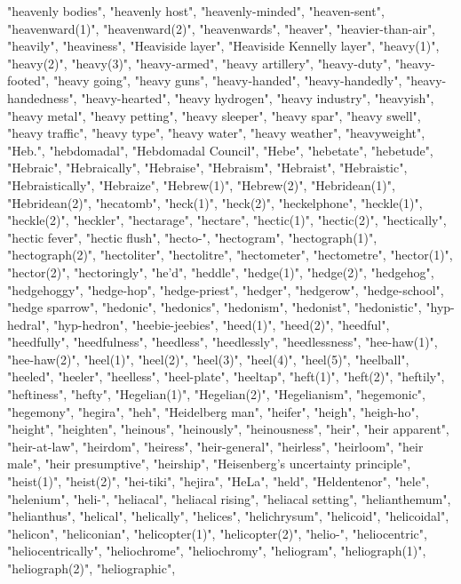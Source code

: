 "heavenly bodies",
"heavenly host",
"heavenly-minded",
"heaven-sent",
"heavenward(1)",
"heavenward(2)",
"heavenwards",
"heaver",
"heavier-than-air",
"heavily",
"heaviness",
"Heaviside layer",
"Heaviside Kennelly layer",
"heavy(1)",
"heavy(2)",
"heavy(3)",
"heavy-armed",
"heavy artillery",
"heavy-duty",
"heavy-footed",
"heavy going",
"heavy guns",
"heavy-handed",
"heavy-handedly",
"heavy-handedness",
"heavy-hearted",
"heavy hydrogen",
"heavy industry",
"heavyish",
"heavy metal",
"heavy petting",
"heavy sleeper",
"heavy spar",
"heavy swell",
"heavy traffic",
"heavy type",
"heavy water",
"heavy weather",
"heavyweight",
"Heb.",
"hebdomadal",
"Hebdomadal Council",
"Hebe",
"hebetate",
"hebetude",
"Hebraic",
"Hebraically",
"Hebraise",
"Hebraism",
"Hebraist",
"Hebraistic",
"Hebraistically",
"Hebraize",
"Hebrew(1)",
"Hebrew(2)",
"Hebridean(1)",
"Hebridean(2)",
"hecatomb",
"heck(1)",
"heck(2)",
"heckelphone",
"heckle(1)",
"heckle(2)",
"heckler",
"hectarage",
"hectare",
"hectic(1)",
"hectic(2)",
"hectically",
"hectic fever",
"hectic flush",
"hecto-",
"hectogram",
"hectograph(1)",
"hectograph(2)",
"hectoliter",
"hectolitre",
"hectometer",
"hectometre",
"hector(1)",
"hector(2)",
"hectoringly",
"he'd",
"heddle",
"hedge(1)",
"hedge(2)",
"hedgehog",
"hedgehoggy",
"hedge-hop",
"hedge-priest",
"hedger",
"hedgerow",
"hedge-school",
"hedge sparrow",
"hedonic",
"hedonics",
"hedonism",
"hedonist",
"hedonistic",
"hyp-hedral",
"hyp-hedron",
"heebie-jeebies",
"heed(1)",
"heed(2)",
"heedful",
"heedfully",
"heedfulness",
"heedless",
"heedlessly",
"heedlessness",
"hee-haw(1)",
"hee-haw(2)",
"heel(1)",
"heel(2)",
"heel(3)",
"heel(4)",
"heel(5)",
"heelball",
"heeled",
"heeler",
"heelless",
"heel-plate",
"heeltap",
"heft(1)",
"heft(2)",
"heftily",
"heftiness",
"hefty",
"Hegelian(1)",
"Hegelian(2)",
"Hegelianism",
"hegemonic",
"hegemony",
"hegira",
"heh",
"Heidelberg man",
"heifer",
"heigh",
"heigh-ho",
"height",
"heighten",
"heinous",
"heinously",
"heinousness",
"heir",
"heir apparent",
"heir-at-law",
"heirdom",
"heiress",
"heir-general",
"heirless",
"heirloom",
"heir male",
"heir presumptive",
"heirship",
"Heisenberg's uncertainty principle",
"heist(1)",
"heist(2)",
"hei-tiki",
"hejira",
"HeLa",
"held",
"Heldentenor",
"hele",
"helenium",
"heli-",
"heliacal",
"heliacal rising",
"heliacal setting",
"helianthemum",
"helianthus",
"helical",
"helically",
"helices",
"helichrysum",
"helicoid",
"helicoidal",
"helicon",
"heliconian",
"helicopter(1)",
"helicopter(2)",
"helio-",
"heliocentric",
"heliocentrically",
"heliochrome",
"heliochromy",
"heliogram",
"heliograph(1)",
"heliograph(2)",
"heliographic",
